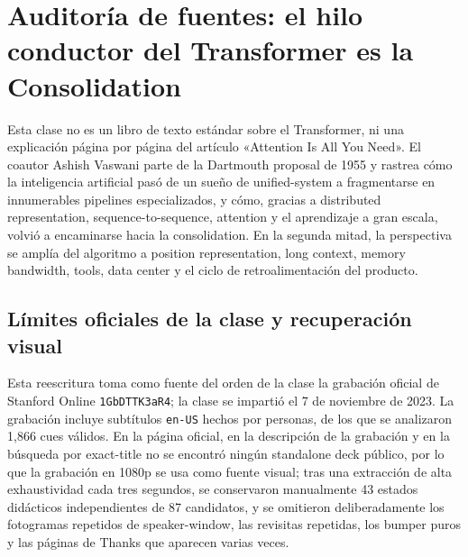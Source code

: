 \documentclass[a4paper]{article}
\begin{document}
\makecscover

\section{Auditoría de fuentes: el hilo conductor del Transformer es la Consolidation}

Esta clase no es un libro de texto estándar sobre el Transformer, ni una explicación página por página del artículo «Attention Is All You Need». El coautor Ashish Vaswani parte de la Dartmouth proposal de 1955 y rastrea cómo la inteligencia artificial pasó de un sueño de unified-system a fragmentarse en innumerables pipelines especializados, y cómo, gracias a distributed representation, sequence-to-sequence, attention y el aprendizaje a gran escala, volvió a encaminarse hacia la consolidation. En la segunda mitad, la perspectiva se amplía del algoritmo a position representation, long context, memory bandwidth, tools, data center y el ciclo de retroalimentación del producto.

\subsection{Límites oficiales de la clase y recuperación visual}

Esta reescritura toma como fuente del orden de la clase la grabación oficial de Stanford Online \texttt{1GbDTTK3aR4}; la clase se impartió el 7 de noviembre de 2023. La grabación incluye subtítulos \texttt{en-US} hechos por personas, de los que se analizaron 1,866 cues válidos. En la página oficial, en la descripción de la grabación y en la búsqueda por exact-title no se encontró ningún standalone deck público, por lo que la grabación en 1080p se usa como fuente visual; tras una extracción de alta exhaustividad cada tres segundos, se conservaron manualmente 43 estados didácticos independientes de 87 candidatos, y se omitieron deliberadamente los fotogramas repetidos de speaker-window, las revisitas repetidas, los bumper puros y las páginas de Thanks que aparecen varias veces.
\end{document}
